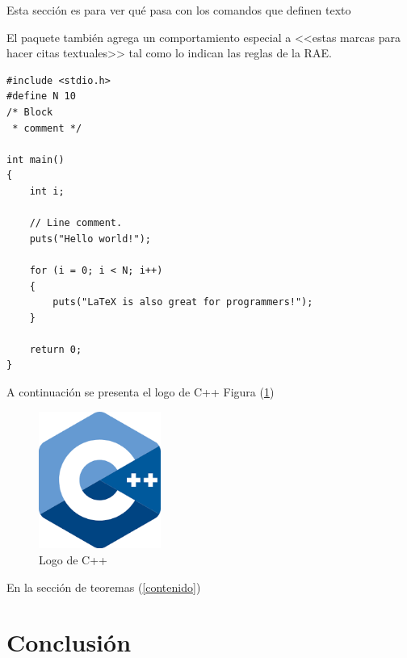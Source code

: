 \documentclass{article}
\begin{document}
Esta sección es para ver qué pasa con los comandos 
que definen texto

El paquete también agrega un comportamiento especial 
a <<estas marcas para hacer citas textuales>> tal como 
lo indican las reglas de la RAE. \cite{dirac}

\begin{lstlisting}
#include <stdio.h>
#define N 10
/* Block
 * comment */

int main()
{
    int i;

    // Line comment.
    puts("Hello world!");
    
    for (i = 0; i < N; i++)
    {
        puts("LaTeX is also great for programmers!");
    }

    return 0;
}
\end{lstlisting}

A continuación se presenta el logo de C++ Figura (\ref{fig:cpplogo})

\begin{figure}[h]
\includegraphics[width=4cm]{cpplogo.png}
\centering
\caption{Logo de C++}
\label{fig:cpplogo}
\end{figure}

En la sección de teoremas (\ref{contenido})

\section{Conclusión} \label{conclulsion}



\end{document}
